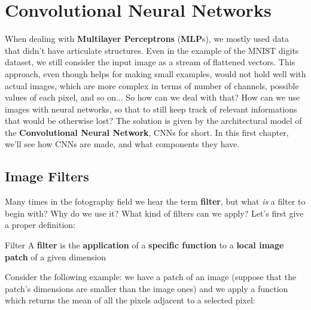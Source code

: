 \chapter{Convolutional Neural Networks}

When dealing with \textbf{Multilayer Perceptrons} (\textbf{MLP}s), we mostly used data that didn't have articulate structures. Even in the example of the MNIST digits dataset, we still consider the input image as a stream of flattened vectors. This approach, even though helps for making small examples, would not hold well with actual images, which are more complex in terms of number of channels, possible values of each pixel, and so on...
\nwl
So how can we deal with that? How can we use images with neural networks, so that to still keep track of relevant informations that would be otherwise lost? The solution is given by the architectural model of the \textbf{Convolutional Neural Network}, CNNs for short. In this first chapter, we'll see how CNNs are made, and what components they have.

\section{Image Filters}

Many times in the fotography field we hear the term \textbf{filter}, but what \textit{is} a filter to begin with? Why do we use it? What kind of filters can we apply? Let's first give a proper definition:

\begin{definition}{Filter}
    A \textbf{filter} is the \textbf{application} of a \textbf{specific function} to a \textbf{local image patch} of a given dimension
\end{definition}

Consider the following example: we have a patch of an image (suppose that the patch's dimensions are smaller than the image ones) and we apply a function which returns the mean of all the pixels adjacent to a selected pixel:


